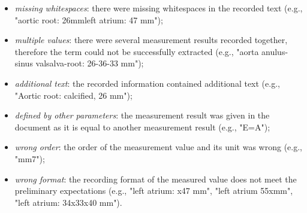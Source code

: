 \begin{itemize}
	\item \textit{missing whitespaces}: there were missing whitespaces in the recorded text (e.g., "aortic root: 26mmleft atrium: 47 mm"); 
	\item \textit{multiple values}: there were several measurement results recorded together, therefore the term could not be successfully extracted (e.g., "aorta anulus-sinus valsalva-root: 26-36-33 mm"); 
	\item \textit{additional text}: the recorded information contained additional text (e.g., "Aortic root: calcified, 26 mm");
	\item \textit{defined by other parameters}: the measurement result was given in the document as it is equal to another measurement result (e.g., "E=A"); 
	\item \textit{wrong order}: the order of the measurement value and its unit was wrong (e.g., "mm7");
	\item \textit{wrong format}: the recording format of the measured value does not meet the preliminary expectations (e.g., "left atrium: x47 mm", "left atrium 55xmm", "left atrium: 34x33x40 mm"). 
\end{itemize}

